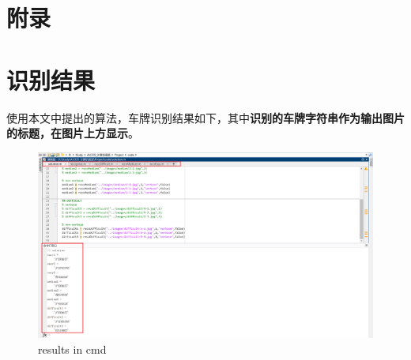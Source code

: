 \documentclass[utf8,a4paper]{ctexart}
\begin{document}
\begin{appendices}
    \section*{\LARGE 附录}

    \section{识别结果}
    使用本文中提出的算法，车牌识别结果如下，其中\textbf{识别的车牌字符串作为输出图片的标题，在图片上方显示}。


    \begin{figure}[H]
        \center
        \includegraphics[width=.9\textwidth]{./img/res.png}
        \caption{results in cmd}
    \end{figure}



\end{appendices}
\end{document}
